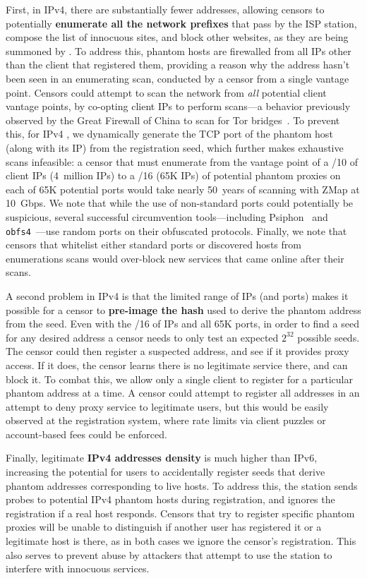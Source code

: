 \documentclass[sigconf]{acmart}
\begin{document}
First, in IPv4, there are substantially fewer addresses,
allowing censors to potentially \textbf{enumerate all the network prefixes}
that pass by the ISP station, compose the list of innocuous sites,
and block other websites, as they are being summoned by \scheme.
To address this, \scheme
phantom hosts are firewalled from all IPs other than the client that registered
them, providing a reason why the address hasn't been seen in an enumerating scan,
conducted by a censor from a single vantage point.
Censors could attempt to scan the network from \emph{all} potential client
vantage points, by co-opting client IPs to perform scans---a behavior previously
observed by the Great Firewall of China to scan for Tor bridges~\cite{ensafi-tor}.
To prevent this, for IPv4 \scheme, we dynamically generate the TCP port of the
phantom host (along with its IP) from the registration seed, which further makes
exhaustive scans infeasible:
a censor that must enumerate from the vantage point of a /10 of client IPs (4~million IPs)
to a /16 (65K IPs) of potential phantom proxies on each of 65K potential ports would take nearly
50~years of scanning with ZMap at 10~Gbps. We note that while the use of
non-standard ports could potentially be suspicious, several successful
circumvention tools---including Psiphon~\cite{psiphon} and
\texttt{obfs4}~\cite{obfs4}---use random ports on their obfuscated protocols.
Finally, we note that censors that whitelist either standard ports or discovered
hosts from enumerations scans would over-block new services that came online after
their scans.

A second problem in IPv4 \scheme is that the limited range of IPs (and ports)
makes it possible for a censor to \textbf{pre-image the hash} used to derive the phantom
address from the seed. Even with the /16 of IPs and all 65K ports, in order to
find a seed for any desired address a censor
needs to only test an expected $2^{32}$ possible seeds.
The censor could then register a suspected
address, and see if it provides proxy access. If it does, the censor learns
there is no legitimate service there, and can block it. To combat this, we
allow only a single client to register for a particular phantom address at a
time. A censor could attempt to register all addresses in an attempt to deny
proxy service to legitimate users, but this would be easily observed at the
registration system, where rate limits via client puzzles or account-based fees
could be enforced.

Finally, legitimate \textbf{IPv4 addresses density} is much higher than IPv6,
increasing the potential for users to accidentally register seeds that derive
phantom addresses corresponding to live hosts. To address this, the station
sends probes to potential IPv4 phantom hosts during registration, and ignores the
registration if a real host responds. Censors that try to register specific
phantom proxies will be unable to distinguish if another user has registered it
or a legitimate host is there, as in both cases we ignore the censor's
registration. This also serves to prevent abuse by attackers that attempt
to use the \scheme station to interfere with innocuous services.
\end{document}
